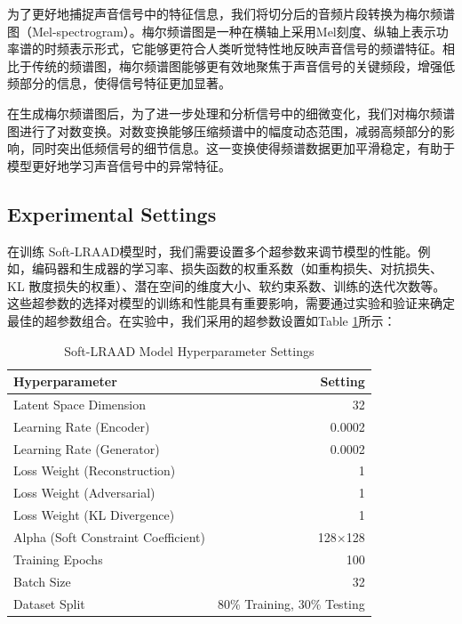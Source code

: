 \documentclass{article}
\begin{document}
为了更好地捕捉声音信号中的特征信息，我们将切分后的音频片段转换为梅尔频谱图（Mel-spectrogram）。梅尔频谱图是一种在横轴上采用Mel刻度、纵轴上表示功率谱的时频表示形式，它能够更符合人类听觉特性地反映声音信号的频谱特征。相比于传统的频谱图，梅尔频谱图能够更有效地聚焦于声音信号的关键频段，增强低频部分的信息，使得信号特征更加显著。

在生成梅尔频谱图后，为了进一步处理和分析信号中的细微变化，我们对梅尔频谱图进行了对数变换。对数变换能够压缩频谱中的幅度动态范围，减弱高频部分的影响，同时突出低频信号的细节信息。这一变换使得频谱数据更加平滑稳定，有助于模型更好地学习声音信号中的异常特征。


\subsection{Experimental Settings}


在训练 Soft-LRAAD模型时，我们需要设置多个超参数来调节模型的性能。例如，编码器和生成器的学习率、损失函数的权重系数（如重构损失、对抗损失、KL 散度损失的权重）、潜在空间的维度大小、软约束系数、训练的迭代次数等。这些超参数的选择对模型的训练和性能具有重要影响，需要通过实验和验证来确定最佳的超参数组合。在实验中，我们采用的超参数设置如Table \ref{tab:params}所示：

\begin{table}
    \centering
    \caption{Soft-LRAAD Model Hyperparameter Settings}
    \label{tab:params}
    \begin{tabular}{lr}
        \toprule
        \textbf{Hyperparameter} & \textbf{Setting} \\
        \midrule
        Latent Space Dimension & 32 \\
        Learning Rate (Encoder) & 0.0002 \\
        Learning Rate (Generator) & 0.0002 \\
        Loss Weight (Reconstruction) & 1 \\
        Loss Weight (Adversarial) & 1 \\
        Loss Weight (KL Divergence) & 1 \\
        Alpha (Soft Constraint Coefficient) & 128$\times $128 \\
        Training Epochs & 100 \\
        Batch Size & 32 \\
        Dataset Split & 80\% Training, 30\% Testing \\
        \bottomrule
    \end{tabular}
\end{table}
\end{document}
